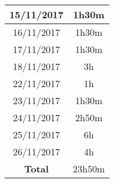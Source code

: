 \begin{tabular}{|c|c|}

	\hline

15/11/2017	& 1h30m \\ 

	\hline 

16/11/2017	& 1h30m \\ 

	\hline 

17/11/2017	& 1h30m \\ 

	\hline 

18/11/2017	& 3h \\ 

	\hline 

22/11/2017	& 1h \\ 

	\hline 

23/11/2017	& 1h30m \\ 

	\hline 

24/11/2017	& 2h50m \\ 

	\hline 

25/11/2017	& 6h \\ 

	\hline

26/11/2017	& 4h \\ 

	\hline

\textbf{Total}	& 23h50m \\

	\hline

\end{tabular}